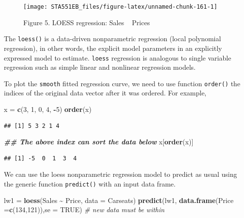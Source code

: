 \documentclass[
]{book}
\newenvironment{Shaded}{\begin{snugshade}}{\end{snugshade}}
\newcommand{\AttributeTok}[1]{\textcolor[rgb]{0.13,0.29,0.53}{#1}}
\newcommand{\CommentTok}[1]{\textcolor[rgb]{0.56,0.35,0.01}{\textit{#1}}}
\newcommand{\ConstantTok}[1]{\textcolor[rgb]{0.56,0.35,0.01}{#1}}
\newcommand{\DecValTok}[1]{\textcolor[rgb]{0.00,0.00,0.81}{#1}}
\newcommand{\DocumentationTok}[1]{\textcolor[rgb]{0.56,0.35,0.01}{\textbf{\textit{#1}}}}
\newcommand{\FunctionTok}[1]{\textcolor[rgb]{0.13,0.29,0.53}{\textbf{#1}}}
\newcommand{\NormalTok}[1]{#1}
\newcommand{\OtherTok}[1]{\textcolor[rgb]{0.56,0.35,0.01}{#1}}
\newcommand{\SpecialCharTok}[1]{\textcolor[rgb]{0.81,0.36,0.00}{\textbf{#1}}}
\begin{document}
\begin{figure}

{\centering \texttt{[image: STA551EB\_files/figure-latex/unnamed-chunk-161-1]} 

}

\caption{Figure 5. LOESS regression: Sales ~ Prices}\label{fig:unnamed-chunk-161}
\end{figure}

The \texttt{loess()} is a data-driven nonparametric regression (local polynomial regression), in other words, the explicit model parameters in an explicitly expressed model to estimate. \texttt{loess} regression is analogous to single variable regression such as simple linear and nonlinear regression models.

To plot the \texttt{smooth} fitted regression curve, we need to use function \texttt{order()} the indices of the original data vector after it was ordered. For example,

\begin{Shaded}
\begin{Highlighting}[]
\NormalTok{x }\OtherTok{=} \FunctionTok{c}\NormalTok{(}\DecValTok{3}\NormalTok{, }\DecValTok{1}\NormalTok{, }\DecValTok{0}\NormalTok{, }\DecValTok{4}\NormalTok{, }\SpecialCharTok{{-}}\DecValTok{5}\NormalTok{)}
\FunctionTok{order}\NormalTok{(x)}
\end{Highlighting}
\end{Shaded}

\begin{verbatim}
## [1] 5 3 2 1 4
\end{verbatim}

\begin{Shaded}
\begin{Highlighting}[]
\DocumentationTok{\#\# The above index can sort the data below}
\NormalTok{x[}\FunctionTok{order}\NormalTok{(x)]}
\end{Highlighting}
\end{Shaded}

\begin{verbatim}
## [1] -5  0  1  3  4
\end{verbatim}

We can use the loess nonparametric regression model to predict as usual using the generic function \texttt{predict()} with an input data frame.

\begin{Shaded}
\begin{Highlighting}[]
\NormalTok{lw1 }\OtherTok{=} \FunctionTok{loess}\NormalTok{(Sales }\SpecialCharTok{\textasciitilde{}}\NormalTok{ Price, }\AttributeTok{data =}\NormalTok{ Carseats)}
\FunctionTok{predict}\NormalTok{(lw1, }\FunctionTok{data.frame}\NormalTok{(}\AttributeTok{Price =}\FunctionTok{c}\NormalTok{(}\DecValTok{134}\NormalTok{,}\DecValTok{121}\NormalTok{)),}\AttributeTok{se =} \ConstantTok{TRUE}\NormalTok{)  }\CommentTok{\# new data must be within }
\end{Highlighting}
\end{Shaded}
\end{document}
